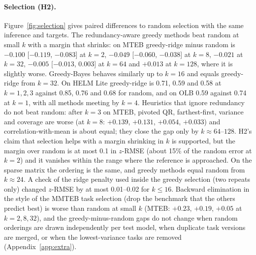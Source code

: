 \documentclass{article}
\begin{document}
\begin{table}[t]
\caption{$z$-RMSE [95\% CI] at selected $k$ (ridge inference, random model split, fixed targets); the last row of each block is the full-information reference. Bold: lowest point estimate; the intervals of the three methods overlap at larger $k$, so bold is not a significance claim (Figure~\ref{fig:selection} gives paired differences).}
\label{tab:main}
\centering\scriptsize
\resizebox{\linewidth}{!}{}
\end{table}

\paragraph{Selection (H2).} Figure~\ref{fig:selection} gives paired differences to random selection with the same inference and targets. The redundancy-aware greedy methods beat random at small $k$ with a margin that shrinks: on MTEB greedy-ridge minus random is $-0.100$ [$-0.119$, $-0.083$] at $k=2$, $-0.049$ [$-0.060$, $-0.038$] at $k=8$, $-0.021$ at $k=32$, $-0.005$ [$-0.013$, $0.003$] at $k=64$ and $+0.013$ at $k=128$, where it is slightly worse. Greedy-Bayes behaves similarly up to $k=16$ and equals greedy-ridge from $k=32$. On HELM Lite greedy-ridge is 0.71, 0.59 and 0.58 at $k=1,2,3$ against 0.85, 0.76 and 0.68 for random, and on OLB 0.59 against 0.74 at $k=1$, with all methods meeting by $k=4$. Heuristics that ignore redundancy do not beat random: after $k=3$ on MTEB, pivoted QR, farthest-first, variance and coverage are worse (at $k=8$: $+0.139$, $+0.131$, $+0.054$, $+0.033$) and correlation-with-mean is about equal; they close the gap only by $k\approx64$--$128$. H2's claim that selection helps with a margin shrinking in $k$ is supported, but the margin over random is at most 0.1 in $z$-RMSE (about 15\% of the random error at $k=2$) and it vanishes within the range where the reference is approached. On the sparse matrix the ordering is the same, and greedy methods equal random from $k\approx24$. A check of the ridge penalty used inside the greedy selection (two repeats only) changed $z$-RMSE by at most 0.01--0.02 for $k\le16$. Backward elimination in the style of the MMTEB task selection (drop the benchmark that the others predict best) is worse than random at small $k$ (MTEB: $+0.23$, $+0.19$, $+0.05$ at $k=2,8,32$), and the greedy-minus-random gaps do not change when random orderings are drawn independently per test model, when duplicate task versions are merged, or when the lowest-variance tasks are removed (Appendix~\ref{app:extra}).
\end{document}
